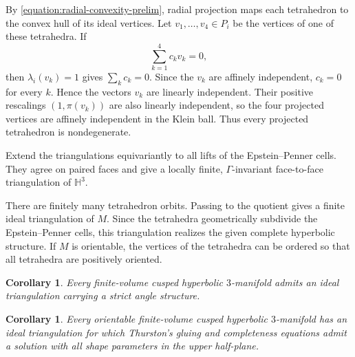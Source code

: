\documentclass[oneside,a4paper,12pt]{article}
\renewcommand{\H}{\mathbb{H}}
\theoremstyle{plain}
\newtheorem{corollary}[theorem]{Corollary}
\theoremstyle{definition}
\theoremstyle{remark}
\numberwithin{equation}{section}
\begin{document}
By \eqref{equation:radial-convexity-prelim}, radial projection maps each tetrahedron to the convex hull of its ideal vertices. Let $v_1,\ldots,v_4\in P_i$ be the vertices of one of these tetrahedra. If
\begin{equation}
\sum_{k=1}^4 c_kv_k=0,
  \nonumber \end{equation}
then $\lambda_i(v_k)=1$ gives $\sum_kc_k=0$. Since the $v_k$ are affinely independent, $c_k=0$ for every $k$. Hence the vectors $v_k$ are linearly independent. Their positive rescalings $(1,\pi(v_k))$ are also linearly independent, so the four projected vertices are affinely independent in the Klein ball. Thus every projected tetrahedron is nondegenerate.

Extend the triangulations equivariantly to all lifts
of the Epstein--Penner cells. They agree on paired
faces and give a locally finite, $\Gamma$-invariant
face-to-face triangulation of $\mathbb H^3$.

There are finitely many tetrahedron orbits. Passing
to the quotient gives a finite ideal triangulation
of $M$. Since the tetrahedra geometrically subdivide
the Epstein--Penner cells, this triangulation
realizes the given complete hyperbolic structure.
If $M$ is orientable, the vertices of the tetrahedra
can be ordered so that all tetrahedra are positively
oriented.


\begin{corollary}\label{corollary:strict-angle}
Every finite-volume cusped hyperbolic $3$-manifold admits an ideal triangulation carrying a strict angle structure.
\end{corollary}


\begin{corollary}\label{corollary:positive-gluing}
Every orientable finite-volume cusped hyperbolic $3$-manifold has an ideal triangulation for which Thurston's gluing and completeness equations admit a solution with all shape parameters in the upper half-plane.
\end{corollary}
\end{document}
